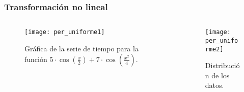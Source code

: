\begin{frame}
	\frametitle{Transformación no lineal}
	
	\begin{columns}
		
		\begin{column}{0.5\textwidth} %
			\begin{figure}
				\centering
				\texttt{[image: per\_uniforme1]} %
				\caption{Gráfica de la serie de tiempo para la función \( 5\cdot \cos\left(\frac{x}{2}\right) + 7\cdot \cos\left(\frac{x^2}{4}\right) \).}
			\end{figure}
		\end{column}
		
		\begin{column}{0.5\textwidth} %
			\begin{figure}
				\centering
				\texttt{[image: per\_uniforme2]} %
				\caption{Distribución de los datos.}
			\end{figure}
		\end{column}
	\end{columns}
\end{frame}



